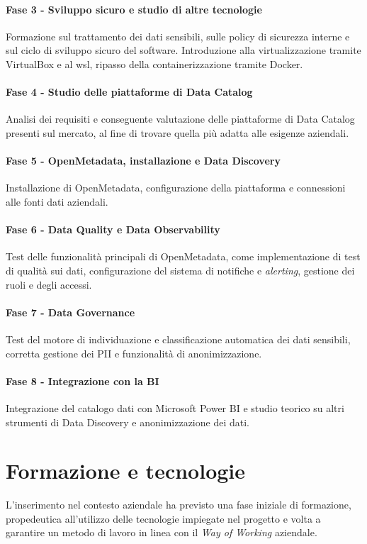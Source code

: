 \paragraph{Fase 3 - Sviluppo sicuro e studio di altre tecnologie}
Formazione sul trattamento dei dati sensibili, sulle policy di sicurezza interne e sul ciclo di sviluppo sicuro del software. Introduzione alla virtualizzazione tramite VirtualBox e al \gls{wsl}, ripasso della containerizzazione tramite Docker.

\paragraph{Fase 4 - Studio delle piattaforme di Data Catalog}
Analisi dei requisiti e conseguente valutazione delle piattaforme di Data Catalog presenti sul mercato, al fine di trovare quella più adatta alle esigenze aziendali.

\paragraph{Fase 5 - OpenMetadata, installazione e Data Discovery}
Installazione di OpenMetadata, configurazione della piattaforma e connessioni alle fonti dati aziendali.

\paragraph{Fase 6 - Data Quality e Data Observability}
Test delle funzionalità principali di OpenMetadata, come implementazione di test di qualità sui dati, configurazione del sistema di notifiche e \emph{alerting}, gestione dei ruoli e degli accessi.

\paragraph{Fase 7 - Data Governance}
Test del motore di individuazione e classificazione automatica dei dati sensibili, corretta gestione dei PII e funzionalità di anonimizzazione.

\paragraph{Fase 8 - Integrazione con la BI}
Integrazione del catalogo dati con Microsoft Power BI e studio teorico su altri strumenti di Data Discovery e anonimizzazione dei dati.

\section{Formazione e tecnologie}
L'inserimento nel contesto aziendale ha previsto una fase iniziale di formazione, propedeutica all'utilizzo delle tecnologie 
impiegate nel progetto e volta a garantire un metodo di lavoro in linea con il \emph{Way of Working} aziendale.

